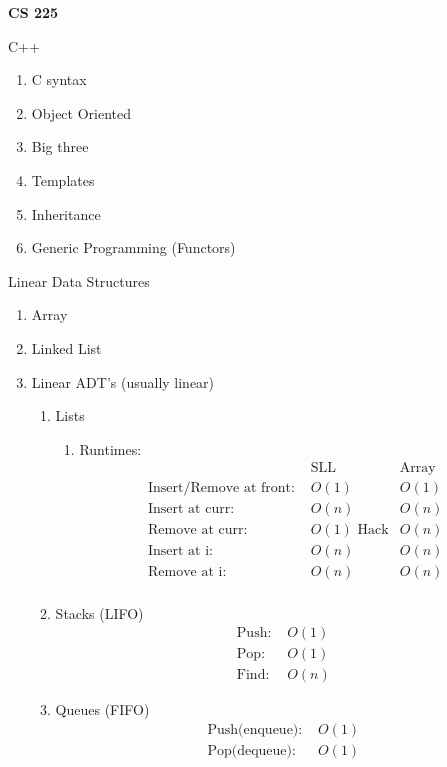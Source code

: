 \documentclass[12pt]{article}
\renewcommand{\=}[1]{\stackrel{#1}{=}} %
\theoremstyle{definition}
\theoremstyle{remark}
\begin{document}
\begin{center}
  {\LARGE
    \textbf{CS 225}\\
  }
  
\end{center}
C++
\begin{enumerate}
\item C syntax
\item Object Oriented
\item Big three
\item Templates
\item Inheritance
\item Generic Programming (Functors)
\end{enumerate}
Linear Data Structures
\begin{enumerate}
\item Array
\item Linked List
\item Linear ADT's (usually linear)
  \begin{enumerate}
  \item Lists
    \begin{enumerate}
    \item Runtimes:
      \begin{align*}
        &\textrm{SLL} & \textrm{Array}\\
        \textrm{Insert/Remove at front:   } & O(1) & O(1)\\
        \textrm{Insert at curr:   } & O(n) & O(n)\\
        \textrm{Remove at curr:   } & O(1)\textrm{ Hack} & O(n)\\
        \textrm{Insert at i:   } & O(n) & O(n) \\
        \textrm{Remove at i:   } & O(n) & O(n) \\
      \end{align*}
    \end{enumerate}
    \item Stacks (LIFO)
      \begin{align*}
        \textrm{Push: } & O(1) \\
        \textrm{Pop: } & O(1) \\
        \textrm{Find: } & O(n)
      \end{align*}
    \item Queues (FIFO)
      \begin{align*}
        \textrm{Push(enqueue): } & O(1) \\
        \textrm{Pop(dequeue): } & O(1) \\

\end{align*}
\end{enumerate}
\end{enumerate}
\end{document}
